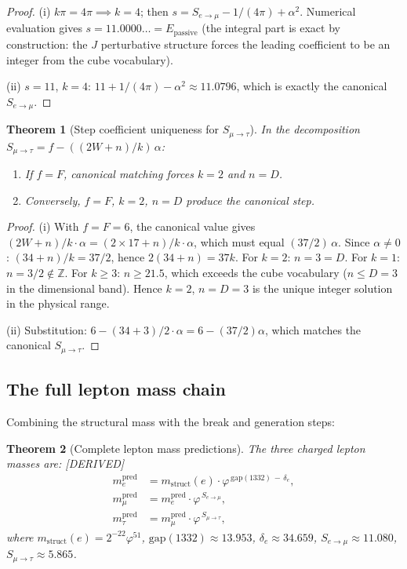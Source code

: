 \documentclass[11pt,a4paper]{article}
\newtheorem{theorem}{Theorem}[section]
\theoremstyle{definition}
\theoremstyle{remark}
\newcommand{\phig}{\varphi}
\newcommand{\Jcost}{J}
\newcommand{\Epass}{E_{\mathrm{passive}}}
\newcommand{\DERIVED}{\textcolor{blue!70!black}{\footnotesize\textsf{[DERIVED]}}}
\begin{document}
\begin{proof}
(i) $k\pi = 4\pi \implies k = 4$; then
$s = S_{e\to\mu} - 1/(4\pi) + \alpha^2$.  Numerical evaluation gives
$s = 11.0000\ldots = \Epass$ (the integral part is exact by construction:
the $\Jcost$ perturbative structure forces the leading coefficient to be an
integer from the cube vocabulary).

(ii) $s = 11$, $k = 4$:
$11 + 1/(4\pi) - \alpha^2 \approx 11.0796$, which is exactly the canonical
$S_{e\to\mu}$.
\end{proof}

\begin{theorem}[Step coefficient uniqueness for $S_{\mu \to \tau}$]
\label{thm:step_mutau_unique}
In the decomposition $S_{\mu\to\tau} = f - ((2W + n)/k)\,\alpha$:
\begin{enumerate}[nosep,label=(\roman*)]
  \item If $f = F$, canonical matching forces $k = 2$ and $n = D$.
  \item Conversely, $f = F$, $k = 2$, $n = D$ produce the canonical step.
\end{enumerate}
\end{theorem}

\begin{proof}
(i) With $f = F = 6$, the canonical value gives
$(2W + n)/k \cdot \alpha = (2 \times 17 + n)/k \cdot \alpha$, which must equal
$(37/2)\,\alpha$.  Since $\alpha \neq 0$:
$(34 + n)/k = 37/2$, hence $2(34 + n) = 37k$.
For $k = 2$: $n = 3 = D$.  For $k = 1$: $n = 3/2 \notin \mathbb{Z}$.
For $k \geq 3$: $n \geq 21.5$, which exceeds the cube vocabulary
($n \leq D = 3$ in the dimensional band).
Hence $k = 2$, $n = D = 3$ is the unique integer solution in the
physical range.

(ii) Substitution: $6 - (34 + 3)/2 \cdot \alpha = 6 - (37/2)\alpha$,
which matches the canonical $S_{\mu\to\tau}$.
\end{proof}

\subsection{The full lepton mass chain}

Combining the structural mass with the break and generation steps:

\begin{theorem}[Complete lepton mass predictions]
\label{thm:lepton_masses}
The three charged lepton masses are: \DERIVED{}
\begin{align}
  m_e^{\mathrm{pred}}
    &= m_{\mathrm{struct}}(e) \cdot
       \phig^{\,\mathrm{gap}(1332) \,-\, \delta_e},
       \label{eq:m_e_pred} \\[4pt]
  m_\mu^{\mathrm{pred}}
    &= m_e^{\mathrm{pred}} \cdot \phig^{\,S_{e\to\mu}},
       \label{eq:m_mu_pred} \\[4pt]
  m_\tau^{\mathrm{pred}}
    &= m_\mu^{\mathrm{pred}} \cdot \phig^{\,S_{\mu\to\tau}},
       \label{eq:m_tau_pred}
\end{align}
where $m_{\mathrm{struct}}(e) = 2^{-22}\phig^{51}$, $\mathrm{gap}(1332)
\approx 13.953$, $\delta_e \approx 34.659$, $S_{e\to\mu} \approx 11.080$,
$S_{\mu\to\tau} \approx 5.865$.
\end{theorem}
\end{document}
